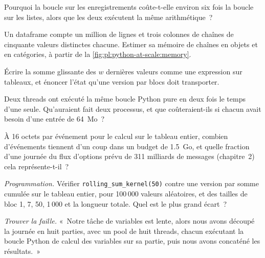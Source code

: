 \begin{exercise}[$\star$]\label{exo:pl:python-at-scale:2}
Pourquoi la boucle sur les enregistrements coûte-t-elle environ six fois la boucle sur les listes, alors que les deux exécutent la même arithmétique~?
\end{exercise}

\begin{exercise}[$\star$]\label{exo:pl:python-at-scale:3}
Un dataframe compte un million de lignes et trois colonnes de chaînes de cinquante valeurs distinctes chacune. Estimer sa mémoire de chaînes en objets et
en catégories, à partir de la \cref{fig:pl:python-at-scale:memory}.
\end{exercise}

\begin{exercise}[$\star\star$]\label{exo:pl:python-at-scale:4}
Écrire la somme glissante des $w$ dernières valeurs comme une expression sur tableaux, et énoncer l'état qu'une version par blocs doit transporter.
\end{exercise}

\begin{exercise}[$\star\star$]\label{exo:pl:python-at-scale:5}
Deux threads ont exécuté la même boucle Python pure en deux fois le temps d'une seule. Qu'auraient fait deux processus, et que
coûteraient-ils si chacun avait besoin d'une entrée de 64~Mo~?
\end{exercise}

\begin{exercise}[$\star\star$]\label{exo:pl:python-at-scale:6}
À 16 octets par événement pour le calcul sur le tableau entier, combien d'événements tiennent d'un coup dans un budget de 1.5~Go, et quelle fraction
d'une journée du flux d'options prévu de 311 milliards de messages (chapitre~2) cela représente-t-il~?
\end{exercise}

\begin{exercise}[$\star\star\star$]\label{exo:pl:python-at-scale:7}
\emph{Programmation.} Vérifier \texttt{rolling\_sum\_kernel(50)} contre une version par somme cumulée sur le tableau entier, pour 100\,000 valeurs aléatoires,
et des tailles de bloc 1, 7, 50, 1\,000 et la longueur totale. Quel est le plus grand écart~?
\end{exercise}

\begin{exercise}[$\star\star\star$]\label{exo:pl:python-at-scale:8}
\emph{Trouver la faille.} «~Notre tâche de variables est lente, alors nous avons découpé la journée en huit parties, avec un pool de huit threads, chacun exécutant
la boucle Python de calcul des variables sur sa partie, puis nous avons concaténé les résultats.~»
\end{exercise}

